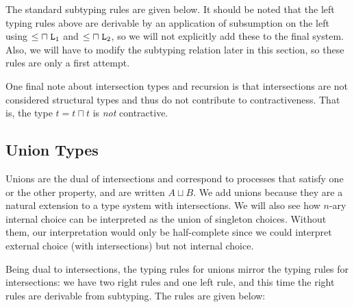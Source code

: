 \documentclass[submission,copyright,creativecommons]{eptcs}
\renewcommand{\intersect}{\mathrel{\sqcap}}
\renewcommand{\union}{\mathrel{\sqcup}}
\begin{document}
The standard subtyping rules are given below. It should be noted that the left typing rules above are derivable by an application of subsumption on the left using $\Sub{\intersect\Left_1}$ and $\Sub{\intersect\Left_2}$, so we will not explicitly add these to the final system. Also, we will have to modify the subtyping relation later in this section, so these rules are only a first attempt.


One final note about intersection types and recursion is that intersections are not considered structural types and thus do not contribute to contractiveness. That is, the type $t = t \intersect t$ is \emph{not} contractive.


\subsection{Union Types}

Unions are the dual of intersections and correspond to processes that satisfy one or the other property, and are written $A \union B$. We add unions because they are a natural extension to a  type system with intersections. We will also see how $n$-ary internal choice can be interpreted as
the union of singleton choices. Without them, our interpretation would only be half-complete since we could interpret external choice (with intersections) but not internal choice.

Being dual to intersections, the typing rules for unions mirror the typing rules for intersections: we have two right rules and one left rule, and this time the right rules are derivable from subtyping. The rules are given below:

\end{document}
